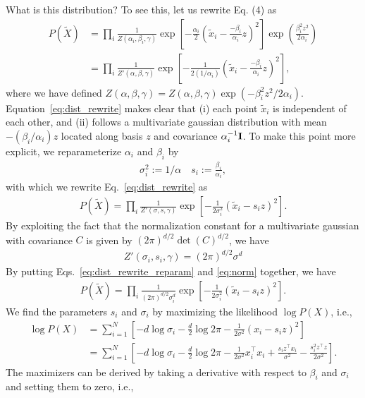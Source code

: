 \documentclass[12pt]{article} %
\begin{document}
What is this distribution? To see this, let us rewrite Eq. (4) as
\begin{align}
P(\tilde X) &=\prod_i \frac{1}{Z(\alpha_i, \beta_i, \gamma)} \exp\left[
-\frac{\alpha_i}{2} \left( \tilde x_i - \frac{-\beta_i}{\alpha_i} z\right)^2
\right]\exp\left(\frac{\beta_i ^2 z^2}{2\alpha_i}\right) \nonumber \\
& =\prod_i \frac{1}{Z'(\alpha, \beta, \gamma)} \exp\left[
-\frac{1}{2(1/\alpha_i)} \left( \tilde x_i - \frac{-\beta_i}{\alpha_i} z\right)^2
\right], \label{eq:dist_rewrite}
\end{align}
where we have defined $Z(\alpha,\beta,\gamma )= Z(\alpha,\beta,\gamma )\exp\left(-\beta_i ^2 z^2 / 2\alpha_i\right)$.
Equation~\eqref{eq:dist_rewrite} makes clear that (i) each point $\tilde x_i$ is independent of each other, and (ii) follows a multivariate gaussian distribution with mean  $-(\beta_i/\alpha_i) z$ located along basis $z$ and covariance $\alpha^{-1} _i{\bf I}$. To make this point more explicit, we reparameterize $\alpha_i$ and $\beta_i$ by
\begin{align}
\sigma^2 _i:= 1/\alpha \quad s_i:= \frac{\beta_i}{\alpha_i}, \label{eq:reparameterize}
\end{align}
with which we rewrite Eq.~\eqref{eq:dist_rewrite} as
\begin{align}
P(\tilde X)=\prod_i \frac{1}{Z'(\sigma,s, \gamma)} \exp\left[
-\frac{1}{2\sigma_i ^2} \left( \tilde x_i - s_i z \right)^2
\right]. \label{eq:dist_rewrite_reparam}
\end{align}
By exploiting the fact that the normalization constant for a multivariate gaussian with covariance $C$ is given by $(2 \pi)^{d/2} \det(C)^{d/2}$, we have
\begin{align}
Z'(\sigma_i, s_i, \gamma) = (2 \pi )^{d/2} \sigma^d \label{eq:norm}
\end{align}
By putting Eqs.~\eqref{eq:dist_rewrite_reparam} and \eqref{eq:norm} together, we have
\begin{align}
P(\tilde X) =\prod_i \frac{1}{(2 \pi)^{d/2}\sigma^d _i} \exp\left[
-\frac{1}{2\sigma^2 _i} \left( \tilde x_i - s_i z\right)^2
\right].
\end{align}
We find the parameters $s_i$ and $\sigma_i$ by maximizing the likelihood $\log P(X)$, i.e.,
\begin{align}
\log P(X) &= \sum_{i=1}^N \left[ -d\log \sigma_i  - \frac{d}{2}\log 2\pi -\frac{1}{2\sigma^2} \left( x_i - s_i z \right)^2 \right] \nonumber \\
& = \sum_{i=1}^N\left[-d\log \sigma_i -\frac{d}{2}\log 2\pi - \frac{1}{2\sigma^2} x_i^\top x_i  + \frac{s_i z^\top x_i}{\sigma^2} - \frac{s_i ^2 z^\top z}{2\sigma^2}\right].
\end{align}
The maximizers can be derived by taking a derivative with respect to $\beta_i$ and $\sigma_i$ and setting them to zero, i.e.,
\end{document}
